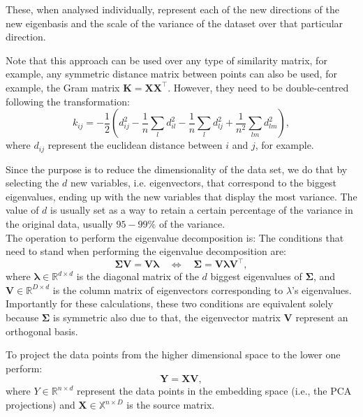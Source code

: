         These, when analysed individually, represent each of the new directions of the new eigenbasis and the scale of the variance of the dataset over that particular direction.

        Note that this approach can be used over any type of similarity matrix, for example, any symmetric distance matrix between points can also be used, for example, the Gram matrix $\bm{K} = \bm{XX}^\top$. However, they need to be double-centred following the transformation:
        \begin{equation}
            k_{ij} = - \frac{1}{2}\left(d_{ij}^2 -\frac{1}{n} \sum_l d_{il}^2 - \frac{1}{n} \sum_l d_{lj}^2 + \frac{1}{n^2} \sum_{lm} d_{lm}^2 \right),
        \end{equation}
        where $d_{ij}$ represent the euclidean distance between $i$ and $j$, for example. %
        
        Since the purpose is to reduce the dimensionality of the data set, we do that by selecting the $d$ new variables, i.e. eigenvectors, that correspond to the biggest eigenvalues, ending up with the new variables that display the most variance. The value of $d$ is usually set as a way to retain a certain percentage of the variance in the original data, usually $95-99\%$ of the variance.\\

        The operation to perform the eigenvalue decomposition is:
        The conditions that need to stand when performing the eigenvalue decomposition are: 
        \begin{equation}
            \bm{\Sigma V} = \bm{V\lambda}
            \quad \iff \quad
            \bm{\Sigma} = \bm{V\lambda V}^\top
            \label{eigenvalue decomposition},
        \end{equation}
        where $\bm{\lambda}\in\mathbb{R}^{d\times d}$ is the diagonal matrix of the $d$ biggest eigenvalues of $\bm{\Sigma}$, and $\bm{V}\in\mathbb{R}^{D\times d}$ is the column matrix of eigenvectors corresponding to $\lambda$'s eigenvalues. Importantly for these calculations, these two conditions are equivalent solely because $\bm{\Sigma}$ is symmetric also due to that, the eigenvector matrix $\bm{V}$ represent an orthogonal basis.

        To project the data points from the higher dimensional space to the lower one perform:
        \begin{equation}
            \bm{Y} = \bm{XV},
            \label{reduction mapping}
        \end{equation}
        where $Y\in\mathbb{R}^{n\times d}$ represent the data points in the embedding space (i.e., the PCA projections) and $\bm{X}\in\mathbb{X}^{n\times D}$ is the source matrix.
        
